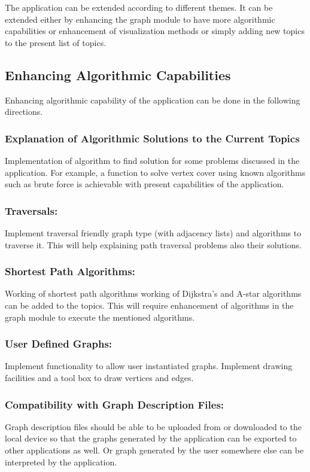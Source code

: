The application can be extended according to different themes. It can be
extended either by enhancing the graph module to have more algorithmic
capabilities or enhancement of visualization methods or simply adding new
topics to the present list of topics.

\subsection{Enhancing Algorithmic Capabilities} 
Enhancing algorithmic capability of the application can be done in the
following directions.

\subsubsection{Explanation of Algorithmic Solutions to the Current Topics} 
Implementation of algorithm to find solution for some problems discussed in the
application. For example, a function to solve vertex cover using known
algorithms such as brute force is achievable with present capabilities of the
application.

\subsubsection{Traversals:} Implement traversal friendly graph type (with
adjacency lists) and algorithms to traverse it. This will help explaining
path traversal problems also their solutions.


\subsubsection{Shortest Path Algorithms:} Working of shortest path algorithms
working of Dijkstra's and A-star algorithms can be added to the topics. This
will require enhancement of algorithms in the graph module to execute the
mentioned algorithms.

\subsubsection{User Defined Graphs:} Implement functionality to allow user
instantiated graphs. Implement drawing facilities and a tool box to draw
vertices and edges.

\subsubsection{Compatibility with Graph Description Files:} Graph description files
should be able to be uploaded from or downloaded to the local device so that
the graphs generated by the application can be exported to other applications
as well. Or graph generated by the user somewhere else can be interpreted by
the application.

